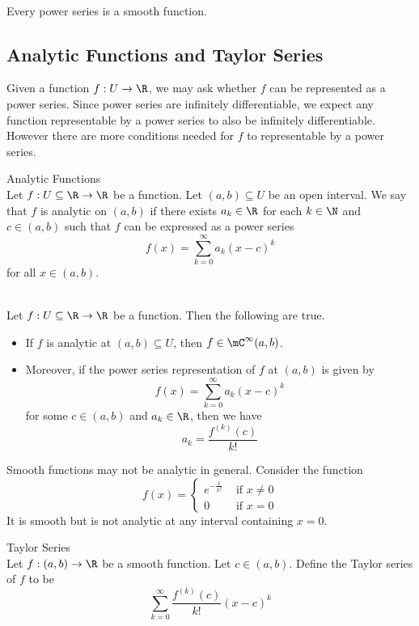 \documentclass[a4paper]{article}
\begin{document}
\begin{lmm}{}{}\\ Every power series is a smooth function. 
\end{lmm}

\subsection{Analytic Functions and Taylor Series}
Given a function $f:U\to\R$, we may ask whether $f$ can be represented as a power series. Since power series are infinitely differentiable, we expect any function representable by a power series to also be infinitely differentiable. However there are more conditions needed for $f$ to representable by a power series. 

\begin{defn}{Analytic Functions}{}\\ Let $f:U\subseteq\R\to\R$ be a function. Let $(a,b)\subseteq U$ be an open interval. We say that $f$ is analytic on $(a,b)$ if there exists $a_k\in\R$ for each $k\in\N$ and $c\in(a,b)$ such that $f$ can be expressed as a power series $$f(x)=\sum_{k=0}^\infty a_k(x-c)^k$$ for all $x\in(a,b)$. 
\end{defn}

\begin{prp}{}{}\\ Let $f:U\subseteq\R\to\R$ be a function. Then the following are true. 
\begin{itemize}
\item If $f$ is analytic at $(a,b)\subseteq U$, then $f\in\mC^\infty(a,b)$. 
\item Moreover, if the power series representation of $f$ at $(a,b)$ is given by $$f(x)=\sum_{k=0}^\infty a_k(x-c)^k$$ for some $c\in(a,b)$ and $a_k\in\R$, then we have $$a_k=\frac{f^{(k)}(c)}{k!}$$
\end{itemize}
\end{prp}

Smooth functions may not be analytic in general. Consider the function $$f(x)=\begin{cases}
e^{-\frac{1}{x^2}} & \text{ if }x\neq 0\\
0 & \text{ if } x=0
\end{cases}$$
It is smooth but is not analytic at any interval containing $x=0$. 

\begin{defn}{Taylor Series}{}\\ Let $f:(a,b)\to\R$ be a smooth function. Let $c\in(a,b)$. Define the Taylor series of $f$ to be $$\sum_{k=0}^{\infty}\frac{f^{(k)}(c)}{k!}(x-c)^k$$
\end{defn}
\end{document}

